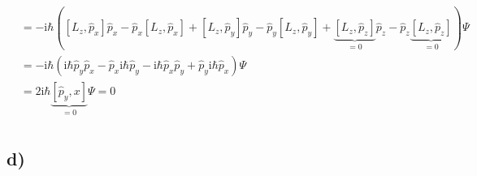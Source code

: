 \begin{align*}
        &= -\text{i}\hbar\left( \left[ L_z,\hat{p}_x \right]\hat{p}_x - \hat{p}_x\left[ L_z,\hat{p}_x \right] + \left[ L_z,\hat{p}_y \right]\hat{p}_y - \hat{p}_y\left[ L_z,\hat{p}_y \right] + \underbrace{\left[ L_z,\hat{p}_z \right]}_{=0}\hat{p}_z - \hat{p}_z\underbrace{\left[ L_z,\hat{p}_z \right]}_{=0}\right) \Psi\\
        &= -\text{i}\hbar\left( \text{i}\hbar \hat{p}_y\hat{p}_x - \hat{p}_x\text{i}\hbar\hat{p}_y - \text{i}\hbar \hat{p}_x\hat{p}_y + \hat{p}_y\text{i}\hbar\hat{p}_x \right) \Psi\\
        &= 2\text{i}\hbar \underbrace{\left[ \hat{p}_y,x \right]}_{=0} \Psi = 0\\
    \end{align*}

    \subsection{d)}





